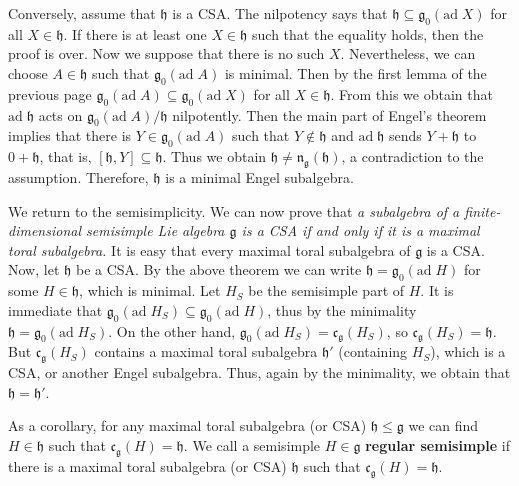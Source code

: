 \documentclass{article}
\newcommand{\lie}[1]{\mathfrak{#1}}
\newcommand{\ad}[1]{\mathrm{ad}\; #1}
\begin{document}
Conversely, assume that $\lie{h}$ is a CSA.
The nilpotency says that $\lie{h} \subseteq \lie{g}_0(\ad{X})$ for all $X \in \lie{h}$.
If there is at least one $X \in \lie{h}$ such that the equality holds, then the proof is over.
Now we suppose that there is no such $X$.
Nevertheless, we can choose $A \in \lie{h}$ such that $\lie{g}_0(\ad{A})$ is minimal.
Then by the first lemma of the previous page $\lie{g}_0(\ad{A}) \subseteq \lie{g}_0(\ad{X})$ for all $X \in \lie{h}$.
From this we obtain that $\ad{\lie{h}}$ acts on $\lie{g}_0(\ad{A})/\lie{h}$ nilpotently.
Then the main part of Engel's theorem implies that there is $Y \in \lie{g}_0(\ad{A})$ such that $Y \notin \lie{h}$ and $\ad{\lie{h}}$ sends $Y + \lie{h}$ to $0 + \lie{h}$, that is, $[\lie{h}, Y] \subseteq \lie{h}$.
Thus we obtain $\lie{h} \ne \lie{n}_\lie{g}(\lie{h})$, a contradiction to the assumption.
Therefore, $\lie{h}$ is a minimal Engel subalgebra.

We return to the semisimplicity.
We can now prove that \textit{a subalgebra of a finite-dimensional semisimple Lie algebra $\lie{g}$ is a CSA if and only if it is a maximal toral subalgebra.}
It is easy that every maximal toral subalgebra of $\lie{g}$ is a CSA.
Now, let $\lie{h}$ be a CSA.
By the above theorem we can write $\lie{h} = \lie{g}_0(\ad{H})$ for some $H \in \lie{h}$, which is minimal.
Let $H_S$ be the semisimple part of $H$.
It is immediate that $\lie{g}_0(\ad{H_S}) \subseteq \lie{g}_0(\ad{H})$, thus by the minimality $\lie{h} = \lie{g}_0(\ad{H_S})$.
On the other hand, $\lie{g}_0(\ad{H_S}) = \lie{c}_\lie{g}(H_S)$, so $\lie{c}_\lie{g}(H_S) = \lie{h}$.
But $\lie{c}_\lie{g}(H_S)$ contains a maximal toral subalgebra $\lie{h}'$ (containing $H_S$), which is a CSA, or another Engel subalgebra.
Thus, again by the minimality, we obtain that $\lie{h} = \lie{h}'$.

As a corollary, for any maximal toral subalgebra (or CSA) $\lie{h} \le \lie{g}$ we can find $H \in \lie{h}$ such that $\lie{c}_\lie{g}(H) = \lie{h}$.
We call a semisimple $H \in \lie{g}$ \textbf{regular semisimple} if there is a maximal toral subalgebra (or CSA) $\lie{h}$ such that $\lie{c}_\lie{g}(H) = \lie{h}$.
\end{document}
